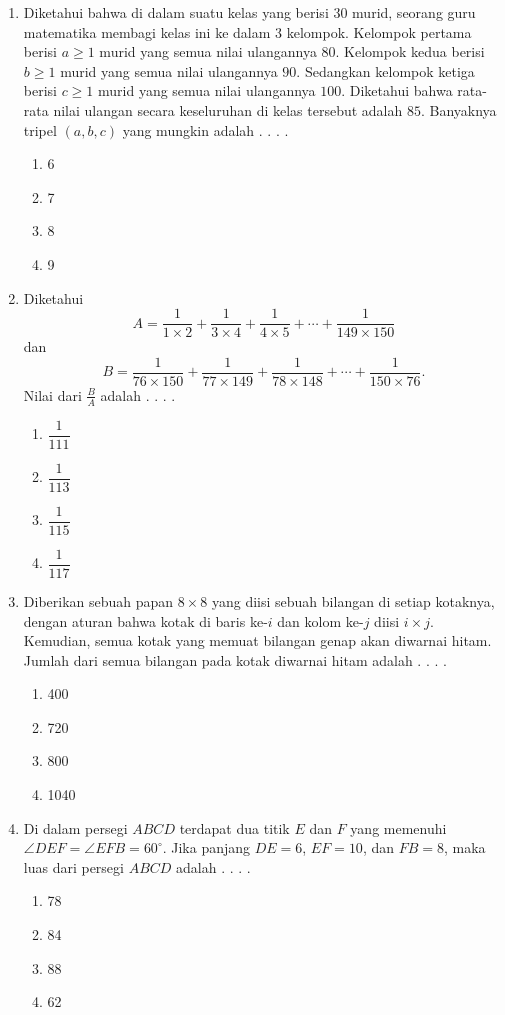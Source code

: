 \documentclass[12pt]{scrartcl}
\begin{document}
\begin{enumerate}
    \item Diketahui bahwa di dalam suatu kelas yang berisi $30$ murid, seorang guru matematika membagi kelas ini ke dalam 3 kelompok. Kelompok pertama berisi $a\ge 1$ murid yang semua nilai ulangannya $80$. Kelompok kedua berisi $b\ge 1$ murid yang semua nilai ulangannya $90$. Sedangkan kelompok ketiga berisi $c\ge 1$ murid yang semua nilai ulangannya $100$. Diketahui bahwa rata-rata nilai ulangan secara keseluruhan di kelas tersebut adalah $85$. Banyaknya tripel $(a,b,c)$ yang mungkin adalah . . . .
    \begin{enumerate}[label={(\Alph*)}]
        \item 6 \item 7 \item 8 \item 9
    \end{enumerate}

    \item Diketahui
    $$ A =\frac{1}{1\times 2} + \frac{1}{3\times 4}+\frac{1}{4\times 5}+\cdots + \frac{1}{149\times 150} $$
    dan 
    $$ B =\frac{1}{76\times 150} + \frac{1}{77\times 149} + \frac{1}{78\times 148}+\cdots + \frac{1}{150\times 76}. $$
    Nilai dari $\frac{B}{A}$ adalah . . . .
    \begin{enumerate}[label={(\Alph*)}]
        \item $\dfrac{1}{111}$ \item $\dfrac{1}{113}$ \item $\dfrac{1}{115}$ \item $\dfrac{1}{117}$
    \end{enumerate}

    \item Diberikan sebuah papan $8\times 8$ yang diisi sebuah bilangan di setiap kotaknya, dengan aturan bahwa kotak di baris ke-$i$ dan kolom ke-$j$ diisi $i\times j$. Kemudian, semua kotak yang memuat bilangan genap akan diwarnai hitam. Jumlah dari semua bilangan pada kotak diwarnai hitam adalah . . . .
    \begin{enumerate}[label={(\Alph*)}]
        \item 400 \item 720 \item 800 \item 1040
    \end{enumerate}

    \item Di dalam persegi $ABCD$ terdapat dua titik $E$ dan $F$ yang memenuhi $\angle DEF=\angle EFB=60^\circ$. Jika panjang $DE=6$, $EF=10$, dan $FB=8$, maka luas dari persegi $ABCD$ adalah . . . .
    \begin{enumerate}[label={(\Alph*)}]
        \item 78 \item 84 \item 88 \item 62
    \end{enumerate}


\end{enumerate}
\end{document}

